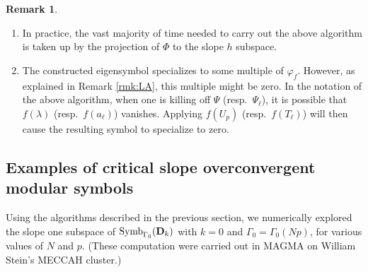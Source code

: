 \documentclass{amsart}
\theoremstyle{plain}
\theoremstyle{definition}
\newtheorem{remark}[thm]{Remark}
\newcommand{\bD}{{\bf D}}
\newcommand{\Dvrig}[1]{\bD_{#1}}
\newcommand{\Dkrig}{\Dvrig{k}}
\DeclareMathOperator{\Symb}{Symb}
\newcommand{\MSo}[1]{\Symb_{\Gamma_0}(#1)}
\begin{document}
\vspace{.2cm}

\begin{remark}
~
\begin{enumerate}

\item In practice, the vast majority of time needed to carry out the above algorithm is taken up by the projection of $\Phi$ to the slope $h$ subspace.  

\item The constructed eigensymbol specializes to some multiple of $\varphi_f$.  However, as explained in Remark \ref{rmk:LA}, this multiple might be zero.  In the notation of the above algorithm, when one is killing off $\Psi$ (resp.\ $\Psi_\ell$), it is possible that $f(\lambda)$ (resp.\ $f(a_\ell)$) vanishes.  Applying $f(U_p)$ (resp.\ $f(T_\ell)$) will then cause the resulting symbol to specialize to zero.
\end{enumerate}
\end{remark}

\subsection{Examples of critical slope overconvergent modular symbols}
\label{sec:exs}
Using the algorithms described in the previous section, we numerically
explored the slope one subspace of $\MSo{\Dkrig}$ with $k=0$ and
$\Gamma_0 = \Gamma_0(Np)$, for various values of $N$ and $p$.  (These computation were carried out in MAGMA \cite{MAGMA} on William Stein's MECCAH cluster.)
\end{document}
